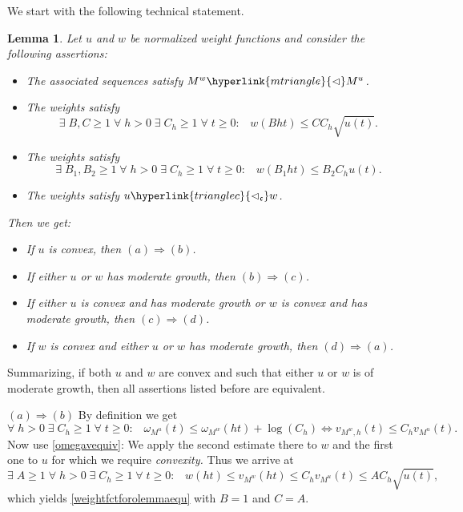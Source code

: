 \documentclass[10pt]{amsart}%
\numberwithin{equation}{section}
\theoremstyle{plain}
\newtheorem{lemma}[proposition]{Lemma}
\begin{document}
We start with the following technical statement.

\begin{lemma}\label{weightfctforolemma}
	Let $u$ and $w$ be normalized weight functions and consider the following assertions:
	\begin{itemize}
		\item[$(a)$] The associated sequences satisfy $M^{w}\hyperlink{mtriangle}{\vartriangleleft}M^{u}$.
		
		\item[$(b)$] The weights satisfy
		\begin{equation}\label{weightfctforolemmaequ}
			\exists\;B,C\ge 1\;\forall\;h>0\;\exists\;C_h\ge 1\;\forall\;t\ge 0:\;\;\;w(Bht)\le CC_h\sqrt{u(t)}.
		\end{equation}
		
		\item[$(c)$] The weights satisfy
		\begin{equation}\label{weightfctforolemmaequ1}
			\exists\;B_1,B_2\ge 1\;\forall\;h>0\;\exists\;C_h\ge 1\;\forall\;t\ge 0:\;\;\;w(B_1ht)\le B_2C_hu(t).
		\end{equation}
		
		\item[$(d)$] The weights satisfy $u\hyperlink{trianglec}{\vartriangleleft_{\mathfrak{c}}}w$.
	\end{itemize}
	
	Then we get:
	
	\begin{itemize}
		\item[$(*)$] If $u$ is convex, then $(a)\Rightarrow(b)$.
		
		\item[$(*)$] If either $u$ or $w$ has moderate growth, then $(b)\Rightarrow(c)$.
		
		\item[$(*)$] If either $u$ is convex and has moderate growth or $w$ is convex and has moderate growth, then $(c)\Rightarrow(d)$.
		
		\item[$(*)$] If $w$ is convex and either $u$ or $w$ has moderate growth, then $(d)\Rightarrow(a)$.
	\end{itemize}
\end{lemma}

Summarizing, if both $u$ and $w$ are convex and such that either $u$ or $w$ is of moderate growth, then all assertions listed before are equivalent.

$(a)\Rightarrow(b)$ By definition we get
$$\forall\;h>0\;\exists\;C_h\ge 1\;\forall\;t\ge 0:\;\;\;\omega_{M^u}(t)\le\omega_{M^w}(ht)+\log(C_h)\Leftrightarrow v_{M^w,h}(t)\le C_hv_{M^u}(t).$$
Now use \eqref{omegavequiv}: We apply the second estimate there to $w$ and the first one to $u$ for which we require \emph{convexity.} Thus we arrive at
$$\exists\;A\ge 1\;\forall\;h>0\;\exists\;C_h\ge 1\;\forall\;t\ge 0:\;\;\;w(ht)\le v_{M^w}(ht)\le C_hv_{M^u}(t)\le AC_h\sqrt{u(t)},$$
which yields \eqref{weightfctforolemmaequ} with $B=1$ and $C=A$.\vspace{6pt}
\end{document}

